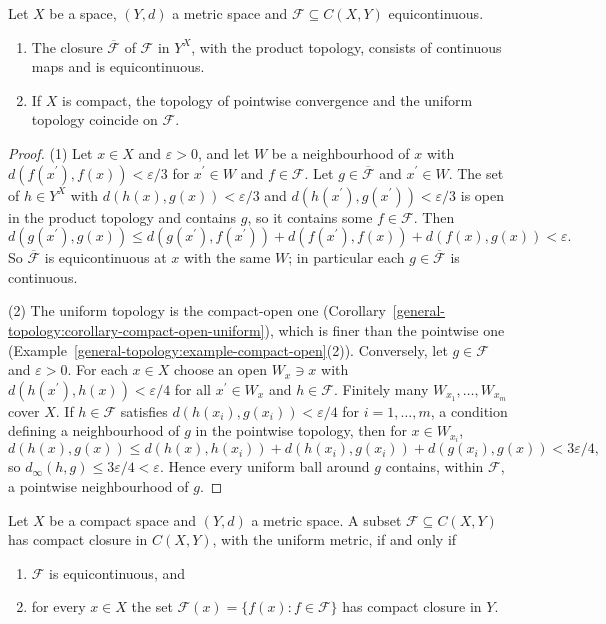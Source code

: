 \begin{lemma}\label{general-topology:lemma-equicontinuous}
Let $X$ be a space, $(Y, d)$ a metric space and $\mathcal{F} \subseteq C(X, Y)$ equicontinuous.
\begin{enumerate}
\item The closure $\overline{\mathcal{F}}$ of $\mathcal{F}$ in $Y^X$, with the product topology, consists of continuous maps and is equicontinuous.
\item If $X$ is compact, the topology of pointwise convergence and the uniform topology coincide on $\mathcal{F}$.
\end{enumerate}
\end{lemma}

\begin{proof}
(1) Let $x \in X$ and $\varepsilon > 0$, and let $W$ be a neighbourhood of $x$ with $d(f(x^{\prime}), f(x)) < \varepsilon/3$ for $x^{\prime} \in W$ and $f \in \mathcal{F}$. Let $g \in \overline{\mathcal{F}}$
and $x^{\prime} \in W$. The set of $h \in Y^X$ with $d(h(x), g(x)) < \varepsilon/3$ and $d(h(x^{\prime}), g(x^{\prime})) < \varepsilon/3$ is open in the product topology and contains $g$, so it contains
some $f \in \mathcal{F}$. Then
\[
d(g(x^{\prime}), g(x)) \leq d(g(x^{\prime}), f(x^{\prime})) + d(f(x^{\prime}), f(x)) + d(f(x), g(x)) < \varepsilon .
\]
So $\overline{\mathcal{F}}$ is equicontinuous at $x$ with the same $W$; in particular each $g \in \overline{\mathcal{F}}$ is continuous.

(2) The uniform topology is the compact-open one (Corollary~\ref{general-topology:corollary-compact-open-uniform}), which is finer than the pointwise one
(Example~\ref{general-topology:example-compact-open}(2)). Conversely, let $g \in \mathcal{F}$ and $\varepsilon > 0$. For each $x \in X$ choose an open $W_x \ni x$ with
$d(h(x^{\prime}), h(x)) < \varepsilon/4$ for all $x^{\prime} \in W_x$ and $h \in \mathcal{F}$. Finitely many $W_{x_1}, \ldots, W_{x_m}$ cover $X$. If $h \in \mathcal{F}$ satisfies
$d(h(x_i), g(x_i)) < \varepsilon/4$ for $i = 1, \ldots, m$, a condition defining a neighbourhood of $g$ in the pointwise topology, then for $x \in W_{x_i}$,
\[
d(h(x), g(x)) \leq d(h(x), h(x_i)) + d(h(x_i), g(x_i)) + d(g(x_i), g(x)) < 3\varepsilon/4,
\]
so $d_\infty(h, g) \leq 3\varepsilon/4 < \varepsilon$. Hence every uniform ball around $g$ contains, within $\mathcal{F}$, a pointwise neighbourhood of $g$.
\end{proof}

\begin{theorem}\label{general-topology:theorem-arzela-ascoli}
Let $X$ be a compact space and $(Y, d)$ a metric space. A subset $\mathcal{F} \subseteq C(X, Y)$ has compact closure in $C(X, Y)$, with the uniform metric, if and only if
\begin{enumerate}
\item $\mathcal{F}$ is equicontinuous, and
\item for every $x \in X$ the set $\mathcal{F}(x) = \{f(x) : f \in \mathcal{F}\}$ has compact closure in $Y$.
\end{enumerate}
\end{theorem}

